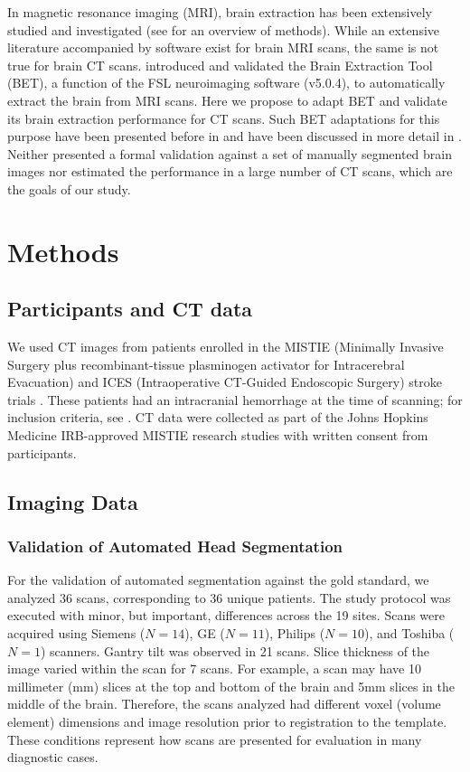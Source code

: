 \documentclass{elsarticle}\usepackage[]{graphicx}\usepackage[]{color}
\begin{document}
In magnetic resonance imaging (MRI), brain extraction has been extensively studied and investigated (see \citet{wang2014knowledge} for an overview of methods).  While an extensive literature accompanied by software exist for brain MRI scans, the same is not true for brain CT scans.  \citet{smith_fast_2002} introduced and validated the Brain Extraction Tool (BET), a function of the FSL \citep{jenkinson_fsl_2012} neuroimaging software (v5.0.4), to automatically extract the brain from MRI scans.  Here we propose to adapt BET and validate its brain extraction performance for CT scans.  Such BET adaptations for this purpose have been presented before in \citet{solomon_user-friendly_2007} and have been discussed in more detail in \citet{rorden_age-specific_2012}.  Neither presented a formal validation against a set of manually segmented brain images nor estimated the performance in a large number of CT scans, which are the goals of our study. 



\section{Methods}
\subsection{ Participants and CT data}
We used CT images from patients enrolled in the MISTIE (Minimally Invasive Surgery plus recombinant-tissue plasminogen activator for Intracerebral Evacuation) and ICES (Intraoperative CT-Guided Endoscopic Surgery) stroke trials \citep{morgan_preliminary_2008}.  These patients had an intracranial hemorrhage at the time of scanning; for inclusion criteria, see \citet{mould_minimally_2013}.   CT data were collected as part of the Johns Hopkins Medicine IRB-approved MISTIE research studies with written consent from participants.  


\subsection{Imaging Data}
\subsubsection{Validation of Automated Head Segmentation}
For the validation of automated segmentation against the gold standard, we analyzed 36 scans, corresponding to 36 unique patients.  The study protocol was executed with minor, but important, differences across the 19 sites.  Scans were acquired using Siemens ($N=14$), GE ($N=11$), Philips ($N=10$), and Toshiba ($N=1$) scanners. Gantry tilt was observed in 21 scans.  Slice thickness of the image varied within the scan for 7 scans. For example, a scan may have 10 millimeter (mm) slices at the top and bottom of the brain and 5mm slices in the middle of the brain.  Therefore, the scans analyzed had different voxel (volume element) dimensions and image resolution prior to registration to the template.  These conditions represent how scans are presented for evaluation in many diagnostic cases.  
\end{document}
